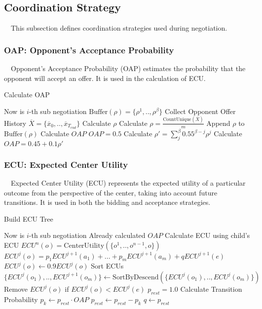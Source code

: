 \documentclass{article}
\begin{document}
\subsection{Coordination Strategy}
　This subsection defines coordination strategies used during negotiation.

\subsubsection{OAP: Opponent's Acceptance Probability}
　Opponent's Acceptance Probability (OAP) estimates the probability that the opponent will accept an offer. 
It is used in the calculation of ECU.

\begin{algorithm}[H]
  \caption{Calculate OAP}
  \label{al:calc-oap}
  \begin{algorithmic}[1]{\scriptsize
	\Require Now is $i$-th sub negotiation 
	\Require $\text{Buffer}(\rho) = \{\rho^1,..,\rho^{\beta}\}$
	\State Collect Opponent Offer History ${\overline{X}}=\{{\overline{x}}_0,..,{\overline{x}}_{T_{end}}\}$
	\Comment Calculate $\rho$
	\State Calculate $\rho = \frac{\text{CountUnique}({\overline{X}})}{m}$
	\State Append $\rho$ to $\text{Buffer}(\rho)$
	\EndIf
	\Comment Calculate $OAP$
		\State $OAP = 0.5$
	\Else
		\State Calculate $\rho'=\sum_{j}^{\beta}0.55^{\beta-j}\rho^{j}$
		\State Calculate $OAP = 0.45 + 0.1\rho'$
	\EndIf
	}\end{algorithmic}
\end{algorithm}

\subsubsection{ECU: Expected Center Utility}
　Expected Center Utility (ECU) represents the expected utility of a particular outcome from the perspective of the center, 
taking into account future transitions.
It is used in both the bidding and acceptance strategies.

\begin{algorithm}[H]
  \caption{Build ECU Tree}
  \label{al:build-ecu-tree}
  \begin{algorithmic}[1]{\scriptsize
	\Require Now is $i$-th sub negotiation 
	\Require Already calculated $OAP$
		\Comment Calculate ECU using child's ECU
				\State $ECU^{n} (o) = \text{CenterUtility}(\{o^1,..,o^{n-1},o\})$
			\Else
				\State $ECU^{j}(o) = p_1ECU^{j+1}(a_{1}) +...+ p_mECU^{j+1}(a_m) + qECU^{j+1}(e)$
					\State $ECU^{j}(o)\leftarrow 0.9ECU^{j}(o)$
				\EndIf
			\EndIf
		\EndFor
		\Comment Sort ECUs
			\State $\{ECU^{j}(o_1),..,ECU^{{j}+1}(o_m)\}\leftarrow \text{SortByDescend} (\{ECU^{j}(o_1),..,ECU^{j}(o_m)\})$
			\State Remove $ECU^{j}(o)$ if $ECU^{j}(o) < ECU^{j}(e)$
			\State $p_{rest}=1.0$
			\Comment Calculate Transition Probability
				\State $p_k \leftarrow p_{rest}\cdot OAP$
				\State $p_{rest} \leftarrow p_{rest} - p_k$
			\EndFor
			\State $q\leftarrow p_{rest}$
		\EndIf
	\EndFor
	}\end{algorithmic}
\end{algorithm}
\end{document}

